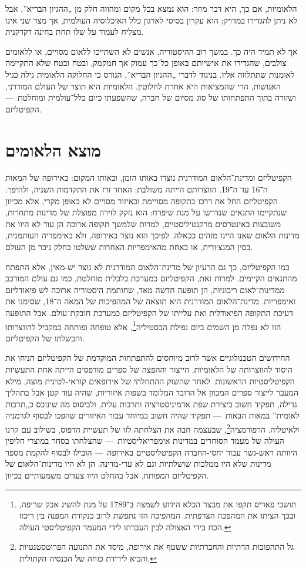 הלאומיות, אם כך, היא דבר מוזר: הוא נמצא בכל מקום ומהווה חלק מן „ההגיון הבריא”, אבל לא ניתן להגדירו במדויק; הוא עקרון בסיסי לארגון כלל האוכלוסיה העולמית, אך מצד שני אינו מצליח לעמוד על שלו תחת בחינה דקדקנית.

אך לא תמיד היה כך. במשך רוב ההיסטוריה, אנשים לא השתייכו ללאום מסויים, או ללאומים צולבים, שהגדירו את אישיותם באופן כל־כך עמוק אך חמקמק, ובטח ובטח שלא התקיימה לאומנות שתתלווה אליו. בניגוד לדברי „ההגיון הבריא”, הגורס כי החלוקה הלאומית גילה כגיל האנושות, הרי שהמציאות היא אחרת לחלוטין. הלאומיות היא תוצר של העולם המודרני, ושזורה בתוך התפתחותו של סוג מסיום של חברה, שהשפעתו כיום כלל־עולמית ומוחלטת~— הקפיטליזם.



\section*{מוצא הלאומים}

הקפיטליזם ומדינת־הלאום המודרנית נוצרו באותו הזמן, ובאותו המקום: באירופה של המאות ה־16 עד ה־19. הווצרותם הייתה משולבת: האחד זרז את התקדמות השניה, ולהיפך. הקפיטליזם החל את דרכו בתקופה מסויימת ובאיזור מסויים לא באופן מקרי, אלא מכיוון שנתקיימו התנאים שנדרשו על מנת שיפרח: הוא נזקק לזירה מפוצלת של מדינות מתחרות, משובצות באינטרסים מרקנטיליסטיים, למרות שלמשך תקופה ארוכה הן עוד לא היוו את מדינות הלאום שאנו היינו מזהים ככאלה. לפיכך הוא נוצר באירופה, ולא באימפריה העותמנית, בסין המנצ׳ורית, או באחת מהאימפריות האחרות ששלטו בחלק ניכר מן העולם.

כמו הקפיטליזם, כך גם הרעיון של מדינת־הלאום המודרנית לא נוצר יש-מאין, אלא התפתח מהתנאים הקיימים. למרות זאת, הקפיטליזם כמערכת כלכלית מוחלטת, כמו גם עולם המורכב ממדינות־לאום ריבוניות, הן תופעה חדשה מאד, שחותמת היסטוריה ארוכה לש פיאודליזם ואימפריות. מדינת־הלאום המודרנית היא תוצאה של המהפיכות של המאה ה־18, שסימנו את דעיכת התקופה הפיאודלית ואת עלייתו של הקפיטליזם כמערכת חובקת־עולם. אבל התופעה הזו לא נפלה מן השמים ביום נפילת הבסטיליה\footnote{תושבי פאריס תקפו את מבצר הכלא הידוע לשמצה ב־1789 על מנת להשיג אבק שריפה, ובכך הציתו את המהפכה הצרפתית. המהפיכה הזו נתפשת לרוב כנקודת המפנה בין ריכוז הכח בידי האצולה לבין העברתו לידי המעמד הקפיטליסטי העולה.}, אלא טופחה ופותחה במקביל להווצרותו והבשלתו של הקפיטליזם.

החידושים הטכנולוגיים אשר לרוב מיוחסים להתפתחות המוקדמת של הקפיטליזם הניחו את היסוד להווצרותה של הלאומיות. הייצור וההפצה של ספרים מודפסים הייתה אחת התעשיות הקפיטליסטיות הראשונות. לאחר שהשוק ההתחלתי של אירופאים קוראי-לטינית מוצה, מילא המעבר לייצור ספרים המכוון אל הרובד המלומד בשפות איזוריות, שהיה עוד קטן אבל בתהליך גדילה, תפקיד חשוב ביצירת שפת אדמיניסטרציה ותרבות עלית, ולביסוס מה שינוכס כ„תרבות לאומית” במאות הבאות~— תפקיד שהיה חשוב במיוחד עבור האיזורים שהפכו לבסוף לגרמניה ולאיטליה. הרפורמציה\footnote{גל התהפוכות הדתיות והחברתיות ששטף את אירופה, מיסד את התנועה הפרוטסטנטיות והביא לירידת כוחה של הכנסיה הקתולית.}, שבעצמה חבה את הצלחתה לזו של תעשיית הדפוס, בשילוב עם קרנו העולה של מעמד הסוחרים במדינות אימפריאליסטיות~— שהצלחתו בסחר במוצרי חליפין היוותה ראש-גשר עבור יחסי-החברה הקפיטליסטיים באירופה~— הובילו לבסוף להקמת מספר מדינות שלא היו ממלכות שושלתיות וגם לא ערי-מדינה. הן לא היו מדינות־הלאום של הקפיטליזם המפותח, אבל בהחלט היוו צעדים משמעותיים בכיוון.

